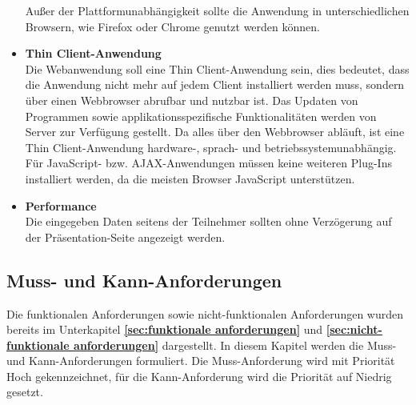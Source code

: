 \begin{itemize}
Außer der Plattformunabhängigkeit sollte die Anwendung in unterschiedlichen Browsern, wie Firefox oder Chrome genutzt werden können.
\item \textbf{Thin Client-Anwendung}\\
Die Webanwendung soll eine Thin Client-Anwendung sein, dies bedeutet, dass die Anwendung nicht mehr auf jedem Client installiert werden muss, sondern über einen Webbrowser abrufbar und nutzbar ist. Das Updaten von Programmen sowie applikationsspezifische Funktionalitäten werden von Server zur Verfügung gestellt. Da alles über den Webbrowser abläuft, ist eine Thin Client-Anwendung hardware-, sprach- und betriebssystemunabhängig. Für JavaScript- bzw. AJAX-Anwendungen müssen keine weiteren Plug-Ins installiert werden, da die meisten Browser JavaScript unterstützen. 
\item \textbf{Performance}\\
Die eingegeben Daten seitens der Teilnehmer sollten ohne Verzögerung auf der Präsentation-Seite angezeigt werden.
\end{itemize}

\subsection{Muss- und Kann-Anforderungen}
\label{muss- und kann-Anforderungen}
Die funktionalen Anforderungen sowie nicht-funktionalen Anforderungen wurden bereits im Unterkapitel \textbf{\ref{sec:funktionale anforderungen}} und \textbf{\ref{sec:nicht-funktionale anforderungen}} dargestellt. In diesem Kapitel werden die Muss- und Kann-Anforderungen formuliert. Die Muss-Anforderung wird mit Priorität \glqq Hoch\grqq{} gekennzeichnet, für die Kann-Anforderung wird die Priorität auf \glqq Niedrig\grqq{} gesetzt.


